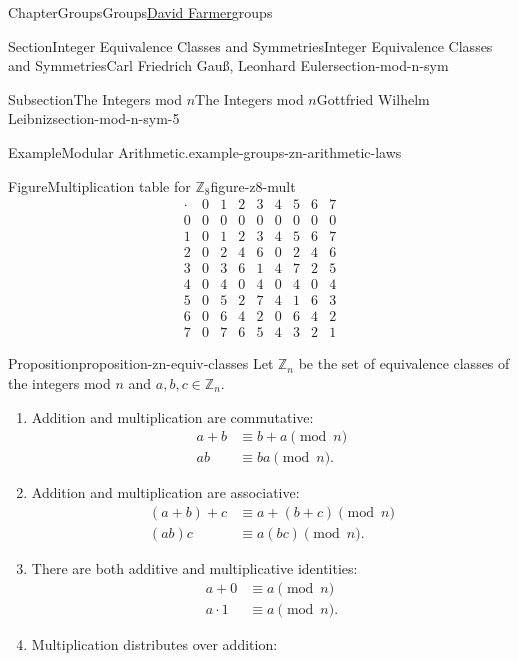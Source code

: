 \documentclass[oneside,10pt,]{book}
\numberwithin{equation}{section}
\begin{document}
\begin{chapterptx}{Chapter}{Groups}{}{Groups}{\hyperlink{dfarmer}{David Farmer}}{}{groups}
\begin{sectionptx}{Section}{Integer Equivalence Classes and Symmetries}{}{Integer Equivalence Classes and Symmetries}{Carl Friedrich Gauß, Leonhard Euler}{}{section-mod-n-sym}
\begin{subsectionptx}{Subsection}{The Integers mod \(n\)}{}{The Integers mod \(n\)}{Gottfried Wilhelm Leibniz}{}{section-mod-n-sym-5}
\begin{example}{Example}{Modular Arithmetic.}{example-groups-zn-arithmetic-laws}
\begin{figureptx}{Figure}{Multiplication table for \({\mathbb Z_8}\)}{figure-z8-mult}{}%
\centering
%
\begin{equation*}
\begin{array}{c|cccccccc}
\cdot & 0 & 1 & 2 & 3 & 4 & 5 & 6 & 7 \\
\hline
0       & 0 & 0 & 0 & 0 & 0 & 0 & 0 & 0 \\
1       & 0 & 1 & 2 & 3 & 4 & 5 & 6 & 7 \\
2       & 0 & 2 & 4 & 6 & 0 & 2 & 4 & 6 \\
3       & 0 & 3 & 6 & 1 & 4 & 7 & 2 & 5 \\
4       & 0 & 4 & 0 & 4 & 0 & 4 & 0 & 4 \\
5       & 0 & 5 & 2 & 7 & 4 & 1 & 6 & 3 \\
6       & 0 & 6 & 4 & 2 & 0 & 6 & 4 & 2 \\
7       & 0 & 7 & 6 & 5 & 4 & 3 & 2 & 1 
\end{array}
\end{equation*}
%
\tcblower
\end{figureptx}%
\end{example}
\begin{proposition}{Proposition}{}{}{proposition-zn-equiv-classes}%
Let \({\mathbb Z}_n\) be the set of equivalence classes of the integers mod \(n\) and \(a, b, c \in {\mathbb Z}_n\).%
\begin{enumerate}
\item{}Addition and multiplication are commutative:%
\begin{align*}
a + b  & \equiv  b + a \pmod{ n}\\
a  b   & \equiv  b  a \pmod{ n}. 
\end{align*}
%
\item{}Addition and multiplication are associative:%
\begin{align*}
(a + b) + c  & \equiv  a + (b + c)\pmod{ n}\\
(a  b)  c    & \equiv  a   (b  c) \pmod{ n}\text{.}
\end{align*}
%
\item{}There are both additive and multiplicative identities:%
\begin{align*}
a + 0  & \equiv  a \pmod{ n}\\
a \cdot  1  & \equiv  a \pmod{ n}\text{.}
\end{align*}
%
\item{}Multiplication distributes over addition:%
\begin{gather*}

\end{gather*}
\end{enumerate}
\end{proposition}
\end{subsectionptx}
\end{sectionptx}
\end{chapterptx}
\end{document}
